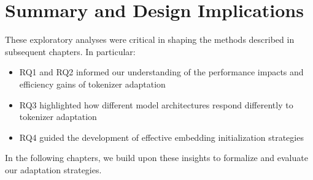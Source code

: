 \section{Summary and Design Implications}
\label{sec:exploration_summary}

These exploratory analyses were critical in shaping the methods described in subsequent chapters. In particular:
\begin{itemize}
    \item RQ1 and RQ2 informed our understanding of the performance impacts and efficiency gains of tokenizer adaptation
    \item RQ3 highlighted how different model architectures respond differently to tokenizer adaptation 
    \item RQ4 guided the development of effective embedding initialization strategies
\end{itemize}

In the following chapters, we build upon these insights to formalize and evaluate our adaptation strategies.
